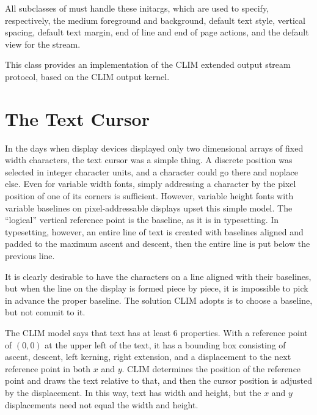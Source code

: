All subclasses of  must handle these initargs, which
are used to specify, respectively, the medium foreground and background, default
text style, vertical spacing, default text margin, end of line and end of page
actions, and the default view for the stream.


This class provides an implementation of the CLIM extended output stream
protocol, based on the CLIM output kernel.

\Mutable


\section {The Text Cursor}

In the days when display devices displayed only two dimensional arrays of fixed
width characters, the text cursor was a simple thing.  A discrete position was
selected in integer character units, and a character could go there and noplace
else.  Even for variable width fonts, simply addressing a character by the pixel
position of one of its corners is sufficient.  However, variable height fonts
with variable baselines on pixel-addressable displays upset this simple model.
The ``logical'' vertical reference point is the baseline, as it is in
typesetting.  In typesetting, however, an entire line of text is created with
baselines aligned and padded to the maximum ascent and descent, then the entire
line is put below the previous line.  

It is clearly desirable to have the characters on a line aligned with their
baselines, but when the line on the display is formed piece by piece, it is
impossible to pick in advance the proper baseline.  The solution CLIM adopts is
to choose a baseline, but not commit to it.

The CLIM model says that text has at least 6 properties.  With a reference point
of $(0,0)$ at the upper left of the text, it has a bounding box consisting of
ascent, descent, left kerning, right extension, and a displacement to the next
reference point in both $x$ and $y$.  CLIM determines the position of the
reference point and draws the text relative to that, and then the cursor
position is adjusted by the displacement.  In this way, text has width and
height, but the $x$ and $y$ displacements need not equal the width and height.

